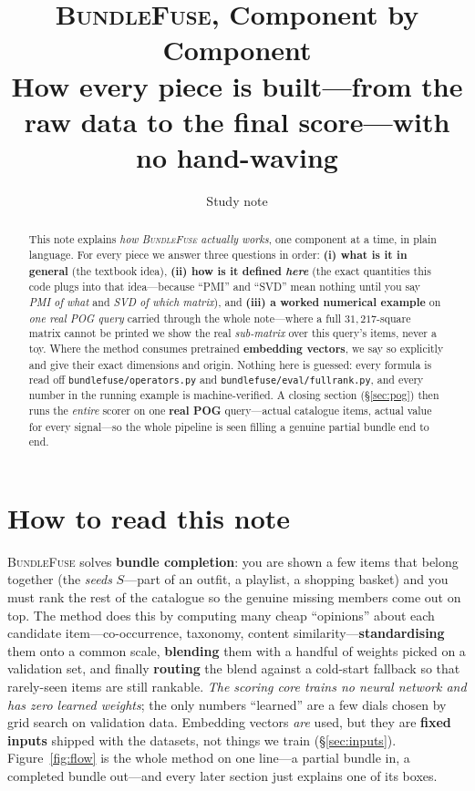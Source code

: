 \documentclass[11pt]{article}
\title{\textbf{\textsc{BundleFuse}, Component by Component}\\[3pt]
\large How every piece is built---from the raw data to the final score---with no hand-waving}
\author{Study note}
\date{}
\theoremstyle{remark}
\newcommand{\code}[1]{\texttt{\small #1}}
\begin{document}
\maketitle

\begin{abstract}
\noindent This note explains \emph{how \textsc{BundleFuse} actually works}, one component at a time, in plain
language. For every piece we answer three questions in order: \textbf{(i) what is it in general} (the textbook idea),
\textbf{(ii) how is it defined \emph{here}} (the exact quantities this code plugs into that idea---because ``PMI''
and ``SVD'' mean nothing until you say \emph{PMI of what} and \emph{SVD of which matrix}), and \textbf{(iii) a
worked numerical example} on \emph{one real \textsc{POG} query} carried through the whole note---where a full
$31{,}217$-square matrix cannot be printed we show the real \emph{sub-matrix} over this query's items, never a toy. Where the method consumes pretrained
\textbf{embedding vectors}, we say so explicitly and give their exact dimensions and origin. Nothing here is guessed:
every formula is read off \code{bundlefuse/operators.py} and \code{bundlefuse/eval/fullrank.py}, and every number in
the running example is machine-verified. A closing section (\S\ref{sec:pog}) then runs the \emph{entire} scorer on
one \textbf{real \textsc{POG}} query---actual catalogue items, actual value for every signal---so the whole pipeline
is seen filling a genuine partial bundle end to end.
\end{abstract}

\tableofcontents

\section{How to read this note}

\textsc{BundleFuse} solves \textbf{bundle completion}: you are shown a few items that belong together (the
\emph{seeds} $S$---part of an outfit, a playlist, a shopping basket) and you must rank the rest of the catalogue so
the genuine missing members come out on top. The method does this by computing many cheap ``opinions'' about each
candidate item---co-occurrence, taxonomy, content similarity---\textbf{standardising} them onto a common scale,
\textbf{blending} them with a handful of weights picked on a validation set, and finally \textbf{routing} the blend
against a cold-start fallback so that rarely-seen items are still rankable. \emph{The scoring core trains no neural
network and has zero learned weights}; the only numbers ``learned'' are a few dials chosen by grid search on
validation data. Embedding vectors \emph{are} used, but they are \textbf{fixed inputs} shipped with the datasets, not
things we train (\S\ref{sec:inputs}). Figure~\ref{fig:flow} is the whole method on one line---a partial bundle in, a
completed bundle out---and every later section just explains one of its boxes.
\end{document}
